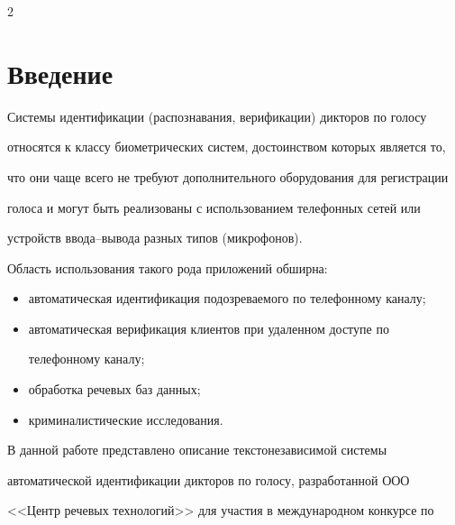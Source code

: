       \begin{multicols}{2}


      


            \label{st\stat}





\section{Введение}





  Системы идентификации (распознавания, верификации) дикторов по голосу 


относятся к классу биометрических систем, достоинством которых является то, 


что они чаще всего не требуют дополнительного оборудования для регистрации 


голоса и могут быть реализованы с использованием телефонных сетей или 


устройств вво\-да--вы\-во\-да разных типов (микрофонов). 


  


  Область использования такого рода приложений обширна:


  \begin{itemize}


\item автоматическая идентификация подозреваемого по телефонному каналу;


\item автоматическая верификация клиентов при удаленном доступе по 


телефонному каналу;


\item обработка речевых баз данных;


\item криминалистические исследования.


\end{itemize}





  В данной работе представлено описание текстонезависимой системы 


автоматической идентификации дикторов по голосу, разработанной ООО 


<<Центр речевых технологий>> для участия в международном конкурсе по 



\end{multicols}

